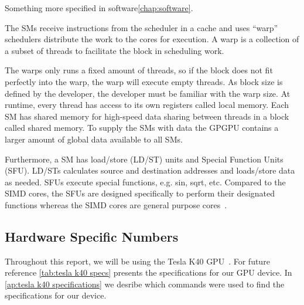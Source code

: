 Something more specified in software\cref{chap:software}.

The SMs receive instructions from the scheduler in a cache and uses ``warp'' schedulers distribute the work to the cores for execution.
A warp is a collection of a subset of threads to facilitate the block in scheduling work.

The warps only runs a fixed amount of threads, so if the block does not fit perfectly into the warp, the warp will execute empty threads.
As block size is defined by the developer, the developer must be familiar with the warp size.
At runtime, every thread has access to its own registers called local memory.
Each SM has shared memory for high-speed data sharing between threads in a block called shared memory.
To supply the SMs with data the GPGPU contains a larger amount of global data available to all SMs.

Furthermore, a SM has load/store (LD/ST) units and Special Function Units (SFU).
LD/STs calculates source and destination addresses and loads/store data as needed.
SFUs execute special functions, e.g. sin, sqrt, etc.
Compared to the SIMD cores, the SFUs are designed specifically to perform their designated functions whereas the SIMD cores are general purpose cores~\cite{fermi2009nvidia}.


\subsection{Hardware Specific Numbers}
\label{sec:hardware specific numbers}
Throughout this report, we will be using the Tesla K40 GPU~\cite{teslak402013nvidia}.
For future reference \cref{tab:tesla k40 specs} presents the specifications for our GPU device.
In \cref{ap:tesla k40 specifications} we desribe which commands were used to find the specifications for our device.

